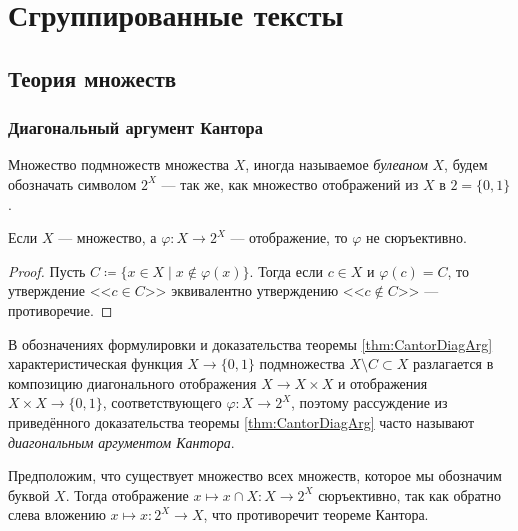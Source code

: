 \documentclass[
	extrafontsizes,
	11pt,
	hyphens,
]{memoir}
\begin{document}
\part{Сгруппированные тексты}



\chapter{Теория множеств}




\section{Диагональный аргумент Кантора}

\begin{notation}
Множество подмножеств множества \(X\), иногда называемое \emph{булеаном} \(X\), будем обозначать символом \(2^X\) --- так же, как множество отображений из \(X\) в \(2 = \{0,1\}\).
\end{notation}

\begin{theorem}
\label{thm:CantorDiagArg}
Если \(X\) --- множество, а \(\varphi : X \to 2^X\) --- отображение, то \(\varphi\) не сюръективно.
\end{theorem}

\begin{proof}
Пусть
\(C \coloneqq \{x \in X \mid x \notin \varphi(x)\}\).
Тогда если \(c \in X\) и \(\varphi(c) = C\),
то утверждение <<\(c \in C\)>> эквивалентно утверждению <<\(c \notin C\)>> --- противоречие.
\end{proof}

\begin{remark}
В обозначениях формулировки и доказательства теоремы \ref{thm:CantorDiagArg} характеристическая функция \(X \to \{0,1\}\) подмножества \(X \setminus C  \subset X\) разлагается в композицию диагонального отображения \(X \to X \times X\) и отображения \(X \times X \to \{0,1\}\), соответствующего \(\varphi : X \to 2^X\),
поэтому рассуждение из приведённого доказательства теоремы \ref{thm:CantorDiagArg} часто называют \emph{диагональным аргументом Кантора}.
\end{remark}

\begin{observation}
Предположим, что существует множество всех множеств, которое мы обозначим буквой \(X\).
Тогда отображение \(x \mapsto x \cap X : X \to 2^X\) сюръективно, так как обратно слева вложению \(x \mapsto x : 2^X \to X\), что противоречит теореме Кантора.
\end{observation}
\end{document}

